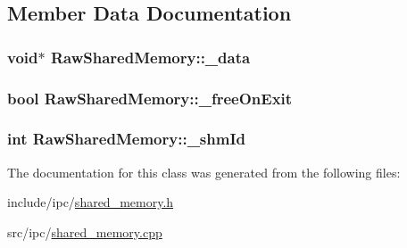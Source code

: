 \subsection{Member Data Documentation}
\hypertarget{classRawSharedMemory_6edaf44782a9f1ddee877875a6cc786e}{
\subsubsection[{\_\-data}]{\setlength{\rightskip}{0pt plus 5cm}void$\ast$ {\bf RawSharedMemory::\_\-data}}}
\label{classRawSharedMemory_6edaf44782a9f1ddee877875a6cc786e}


\hypertarget{classRawSharedMemory_a8c93446e3de31c2f6b683f0a3404358}{
\subsubsection[{\_\-freeOnExit}]{\setlength{\rightskip}{0pt plus 5cm}bool {\bf RawSharedMemory::\_\-freeOnExit}}}
\label{classRawSharedMemory_a8c93446e3de31c2f6b683f0a3404358}


\hypertarget{classRawSharedMemory_b950192a915183bb279f2855f6b0114c}{
\subsubsection[{\_\-shmId}]{\setlength{\rightskip}{0pt plus 5cm}int {\bf RawSharedMemory::\_\-shmId}}}
\label{classRawSharedMemory_b950192a915183bb279f2855f6b0114c}




The documentation for this class was generated from the following files:\begin{CompactItemize}
\item 
include/ipc/\hyperlink{shared__memory_8h}{shared\_\-memory.h}\item 
src/ipc/\hyperlink{shared__memory_8cpp}{shared\_\-memory.cpp}\end{CompactItemize}
